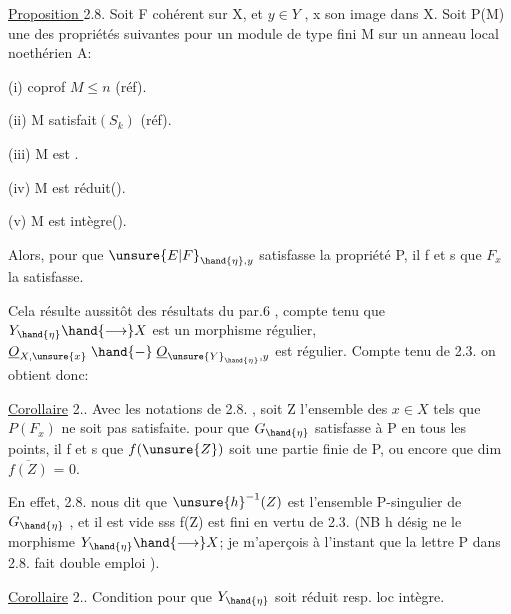 
\uline{Proposition }2.8.  Soit F cohérent sur X, et  $y\in Y$ , x son image
dans X.   Soit P(M) une des propriétés suivantes pour
un module de type fini M sur un anneau local noethérien A:

(i)   coprof $M\leqslant n$   (réf).

(ii)  M satisfait$(S_k)$  (réf).

(iii)  M est .

(iv)  M est réduit().

(v)   M est intègre().

Alors, pour que $\unsure{E|F}_{\hand{\eta},y}$ satisfasse la propriété P, il f et s que $F_x$ la
satisfasse.

Cela résulte aussitôt des résultats du par.6 , compte tenu que
 $Y_{\hand{\eta}}\hand{\longrightarrow} X$  est un morphisme régulier,   $\underline{O}_{X,\unsure{x}}\mathrel{\hand{-}} \underline{O}_{\unsure{Y}_{\hand{\eta}},y}$ est
régulier.  Compte tenu de 2.3. on obtient donc:

\uline{Corollaire} 2..  Avec les notations de 2.8. , soit Z l'ensemble
des $x\in X$ tels que $P(F_x)$ ne soit pas satisfaite.  pour que
$G_{\hand{\eta}}$ satisfasse à P en tous les points, il f et s que $f(\unsure{Z})$ soit une
partie finie de P, ou encore que  dim $\overline{f(Z)}$ = 0.

En effet, 2.8. nous dit que $\unsure{h}^{-1}(Z)$ est l'ensemble P-singulier
de $G_{\hand{\eta}}$ , et il est vide sss f(Z) est fini en vertu de 2.3. (NB h désig
\placedmargin{|} ne le morphisme $Y_{\hand{\eta}}\hand{\longrightarrow} X$; je m'aperçois à l'instant que la lettre P
\placedmargin{|} dans 2.8. fait double emploi ).

\placedmargin{|} \uline{Corollaire} 2..  Condition pour que $Y_{\hand{\eta}}$ soit réduit resp. loc intègre.



